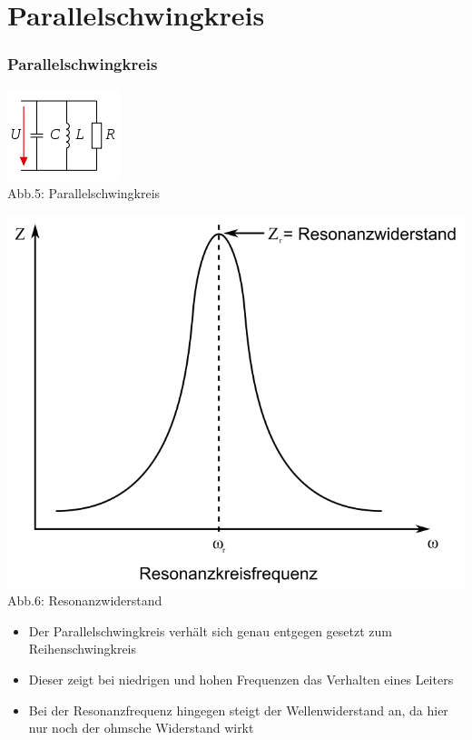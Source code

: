 \section*{Parallelschwingkreis}
\begin{frame}
\frametitle{Parallelschwingkreis}
\begin{center}
	\begin{minipage}{0.4\textwidth}
	\includegraphics[scale=1]{a04/Parallelschw.png}\\
	\tiny{Abb.5: Parallelschwingkreis \cite{wmen}}
	\end{minipage}
	\begin{minipage}{0.4\textwidth}
	\includegraphics[scale=0.2]{a04/ParallelschwSig.png}\\
	\tiny{Abb.6: Resonanzwiderstand \cite{wmen}} 
	\end{minipage}
\end{center}
\begin{itemize}
	\item Der Parallelschwingkreis verhält sich genau entgegen gesetzt zum Reihenschwingkreis
	\item Dieser zeigt bei niedrigen und hohen Frequenzen das Verhalten eines Leiters
	\item Bei der Resonanzfrequenz hingegen steigt der Wellenwiderstand an, da hier nur noch der ohmsche Widerstand wirkt
\end{itemize}
\end{frame}

